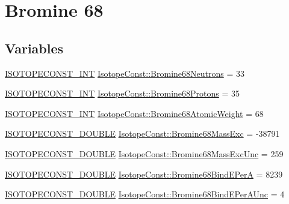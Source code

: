 \hypertarget{group___isotope_const-_bromine-_br68}{}\section{Bromine 68}
\label{group___isotope_const-_bromine-_br68}
\subsection*{Variables}
\begin{DoxyCompactItemize}
\item 
\mbox{\hyperlink{group___isotope_const-_macros_ga5f18360b3e99483a35c32d789e62621c}{I\+S\+O\+T\+O\+P\+E\+C\+O\+N\+S\+T\+\_\+\+I\+NT}} \mbox{\hyperlink{group___isotope_const-_bromine-_br68_ga821b6d816fe45c8f7dfff54d8302ab36}{Isotope\+Const\+::\+Bromine68\+Neutrons}} = 33
\item 
\mbox{\hyperlink{group___isotope_const-_macros_ga5f18360b3e99483a35c32d789e62621c}{I\+S\+O\+T\+O\+P\+E\+C\+O\+N\+S\+T\+\_\+\+I\+NT}} \mbox{\hyperlink{group___isotope_const-_bromine-_br68_gabb60321d5c155aa1b11bc4669b77de4e}{Isotope\+Const\+::\+Bromine68\+Protons}} = 35
\item 
\mbox{\hyperlink{group___isotope_const-_macros_ga5f18360b3e99483a35c32d789e62621c}{I\+S\+O\+T\+O\+P\+E\+C\+O\+N\+S\+T\+\_\+\+I\+NT}} \mbox{\hyperlink{group___isotope_const-_bromine-_br68_ga089fa444b905da13662524fe869a8fba}{Isotope\+Const\+::\+Bromine68\+Atomic\+Weight}} = 68
\item 
\mbox{\hyperlink{group___isotope_const-_macros_ga8f45a7272ce02c0b4c65c44636ed719a}{I\+S\+O\+T\+O\+P\+E\+C\+O\+N\+S\+T\+\_\+\+D\+O\+U\+B\+LE}} \mbox{\hyperlink{group___isotope_const-_bromine-_br68_ga7d7f0cf35d71612f90b149ca49fb7c3b}{Isotope\+Const\+::\+Bromine68\+Mass\+Exc}} = -\/38791
\item 
\mbox{\hyperlink{group___isotope_const-_macros_ga8f45a7272ce02c0b4c65c44636ed719a}{I\+S\+O\+T\+O\+P\+E\+C\+O\+N\+S\+T\+\_\+\+D\+O\+U\+B\+LE}} \mbox{\hyperlink{group___isotope_const-_bromine-_br68_gaf872da8499ba23f99b8ec7bd8a57a5cf}{Isotope\+Const\+::\+Bromine68\+Mass\+Exc\+Unc}} = 259
\item 
\mbox{\hyperlink{group___isotope_const-_macros_ga8f45a7272ce02c0b4c65c44636ed719a}{I\+S\+O\+T\+O\+P\+E\+C\+O\+N\+S\+T\+\_\+\+D\+O\+U\+B\+LE}} \mbox{\hyperlink{group___isotope_const-_bromine-_br68_gabae3c26c50c263c7d678b2599871a28f}{Isotope\+Const\+::\+Bromine68\+Bind\+E\+PerA}} = 8239
\item 
\mbox{\hyperlink{group___isotope_const-_macros_ga8f45a7272ce02c0b4c65c44636ed719a}{I\+S\+O\+T\+O\+P\+E\+C\+O\+N\+S\+T\+\_\+\+D\+O\+U\+B\+LE}} \mbox{\hyperlink{group___isotope_const-_bromine-_br68_ga873ce4bbdcadbf16a58d5c4d8313ad8c}{Isotope\+Const\+::\+Bromine68\+Bind\+E\+Per\+A\+Unc}} = 4

\end{DoxyCompactItemize}
